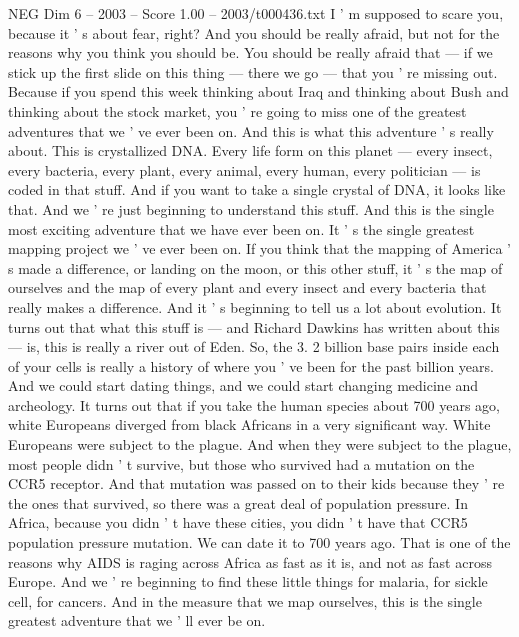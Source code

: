 \begin{textsample}{NEG Dim 6 – 2003 – Score 1.00 – 2003/t000436.txt}  \label{ex:f6_neg_059}
I ' m supposed to scare you, because it ' s about fear, right?
And you should be really afraid, but not for the reasons why you think you should be.
You should be really afraid that — if we stick up the first slide on this thing — there we go — that you ' re missing out.
Because if you spend this week thinking about Iraq and thinking about Bush and thinking about the stock market, you ' re going to miss one of the greatest adventures that we ' ve ever been on.
And this is what this adventure ' s really about.
This is crystallized DNA.
Every life form on this planet — every insect, every bacteria, every plant, every animal, every human, every politician — is coded in that stuff.
And if you want to take a single crystal of DNA, it looks like that.
And we ' re just beginning to understand this stuff.
And this is the single most exciting adventure that we have ever been on.
It ' s the single greatest mapping project we ' ve ever been on.
If you think that the mapping of America ' s made a difference, or landing on the moon, or this other stuff, it ' s the map of ourselves and the map of every plant and every insect and every bacteria that really makes a difference.
And it ' s beginning to tell us a lot about evolution.
It turns out that what this stuff is — and Richard Dawkins has written about this — is, this is really a river out of Eden.
So, the 3. 2 billion base pairs inside each of your cells is really a history of where you ' ve been for the past billion years.
And we could start dating things, and we could start changing medicine and archeology.
It turns out that if you take the human species about 700 years ago, white Europeans diverged from black Africans in a very significant way.
White Europeans were subject to the plague.
And when they were subject to the plague, most people didn ' t survive, but those who survived had a mutation on the CCR5 receptor.
And that mutation was passed on to their kids because they ' re the ones that survived, so there was a great deal of population pressure.
In Africa, because you didn ' t have these cities, you didn ' t have that CCR5 population pressure mutation.
We can date it to 700 years ago.
That is one of the reasons why AIDS is raging across Africa as fast as it is, and not as fast across Europe.
And we ' re beginning to find these little things for malaria, for sickle cell, for cancers.
And in the measure that we map ourselves, this is the single greatest adventure that we ' ll ever be on.

\end{textsample}
